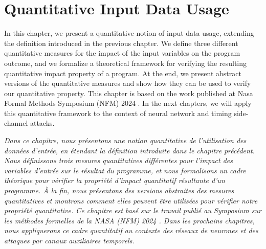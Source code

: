 %

\chapter{Quantitative Input Data Usage}


In this chapter, we present a quantitative notion of input data usage, extending the definition introduced in the previous chapter.
We define three different quantitative measures for the impact of the input variables on the program outcome, and we formalize a theoretical framework for verifying the resulting quantitative impact property of a program.
At the end, we present abstract versions of the quantitative measures and show how they can be used to verify our quantitative property.
This chapter is based on the work published at Nasa Formal Methods Symposium (NFM) 2024 \cite{Mazzucato2024nfm}.
In the next chapters, we will apply this quantitative framework to the context of neural network and timing side-channel attacks.

\emph{Dans ce chapitre, nous présentons une notion quantitative de l'utilisation des données d'entrée, en étendant la définition introduite dans le chapitre précédent. Nous définissons trois mesures quantitatives différentes pour l'impact des variables d'entrée sur le résultat du programme, et nous formalisons un cadre théorique pour vérifier la propriété d'impact quantitatif résultante d'un programme. À la fin, nous présentons des versions abstraites des mesures quantitatives et montrons comment elles peuvent être utilisées pour vérifier notre propriété quantitative. Ce chapitre est basé sur le travail publié au Symposium sur les méthodes formelles de la NASA (NFM) 2024 . Dans les prochains chapitres, nous appliquerons ce cadre quantitatif au contexte des réseaux de neurones et des attaques par canaux auxiliaires temporels.
}



% 
% 
% 
% 


